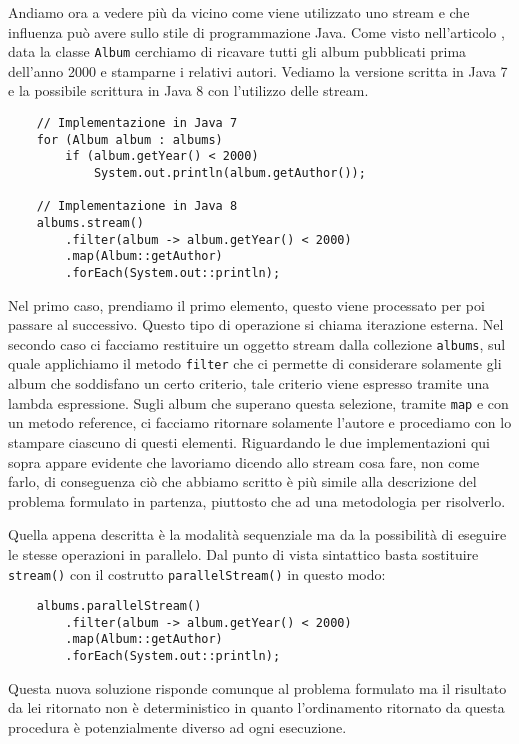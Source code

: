 		Andiamo ora a vedere più da vicino come viene utilizzato uno stream e che influenza può avere sullo stile di programmazione Java. Come visto nell'articolo \cite{java-8-stream}, data la classe \lstinline|Album| cerchiamo di ricavare tutti gli album pubblicati prima dell'anno 2000 e stamparne i relativi autori. Vediamo la versione scritta in Java 7 e la possibile scrittura in Java 8 con l'utilizzo delle stream.
		\begin{lstlisting}
	// Implementazione in Java 7
	for (Album album : albums)
		if (album.getYear() < 2000)
			System.out.println(album.getAuthor());
	
	// Implementazione in Java 8
	albums.stream()
		.filter(album -> album.getYear() < 2000)
		.map(Album::getAuthor)
		.forEach(System.out::println);
		\end{lstlisting}
		Nel primo caso, prendiamo il primo elemento, questo viene processato per poi passare al successivo. Questo tipo di operazione si chiama iterazione esterna. Nel secondo caso ci facciamo restituire un oggetto stream dalla collezione \lstinline|albums|, sul quale applichiamo il metodo \lstinline|filter| che ci permette di considerare solamente gli album che soddisfano un certo criterio, tale criterio viene espresso tramite una lambda espressione. Sugli album che superano questa selezione, tramite \lstinline|map| e con un metodo reference, ci facciamo ritornare solamente l'autore e procediamo con lo stampare ciascuno di questi elementi. Riguardando le due implementazioni qui sopra appare evidente che lavoriamo dicendo allo stream cosa fare, non come farlo, di conseguenza ciò che abbiamo scritto è più simile alla descrizione del problema formulato in partenza, piuttosto che ad una metodologia per risolverlo. 
		
		Quella appena descritta è la modalità sequenziale ma da la possibilità di eseguire le stesse operazioni in parallelo. Dal punto di vista sintattico basta sostituire \lstinline|stream()| con il costrutto \lstinline|parallelStream()| in questo modo:
		\begin{lstlisting}
	albums.parallelStream()
		.filter(album -> album.getYear() < 2000)
		.map(Album::getAuthor)
		.forEach(System.out::println);
		\end{lstlisting}
		Questa nuova soluzione risponde comunque al problema formulato ma il risultato da lei ritornato non è deterministico in quanto l'ordinamento ritornato da questa procedura è potenzialmente diverso ad ogni esecuzione.
		
